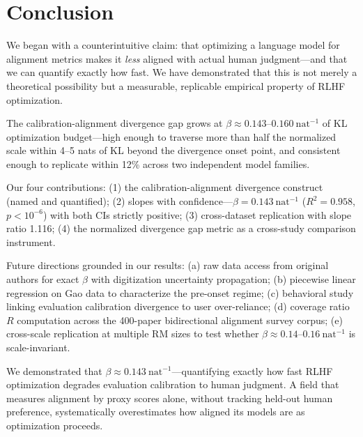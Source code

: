 \section{Conclusion}
\label{sec:conclusion}

We began with a counterintuitive claim: that optimizing a language model for alignment metrics makes it \emph{less} aligned with actual human judgment---and that we can quantify exactly how fast. We have demonstrated that this is not merely a theoretical possibility but a measurable, replicable empirical property of RLHF optimization.

The calibration-alignment divergence gap grows at $\beta \approx 0.143$--$0.160\ \text{nat}^{-1}$ of KL optimization budget---high enough to traverse more than half the normalized scale within 4--5 nats of KL beyond the divergence onset point, and consistent enough to replicate within 12\% across two independent model families.

Our four contributions: (1) the calibration-alignment divergence construct (named and quantified); (2) slopes with confidence---$\beta = 0.143\ \text{nat}^{-1}$ ($R^2 = 0.958$, $p < 10^{-6}$) with both CIs strictly positive; (3) cross-dataset replication with slope ratio 1.116; (4) the normalized divergence gap metric as a cross-study comparison instrument.

Future directions grounded in our results: (a) raw data access from original authors for exact $\beta$ with digitization uncertainty propagation; (b) piecewise linear regression on Gao data to characterize the pre-onset regime; (c) behavioral study linking evaluation calibration divergence to user over-reliance; (d) coverage ratio $R$ computation across the 400-paper bidirectional alignment survey corpus; (e) cross-scale replication at multiple RM sizes to test whether $\beta \approx 0.14$--$0.16\ \text{nat}^{-1}$ is scale-invariant.

We demonstrated that $\beta \approx 0.143\ \text{nat}^{-1}$---quantifying exactly how fast RLHF optimization degrades evaluation calibration to human judgment. A field that measures alignment by proxy scores alone, without tracking held-out human preference, systematically overestimates how aligned its models are as optimization proceeds.
